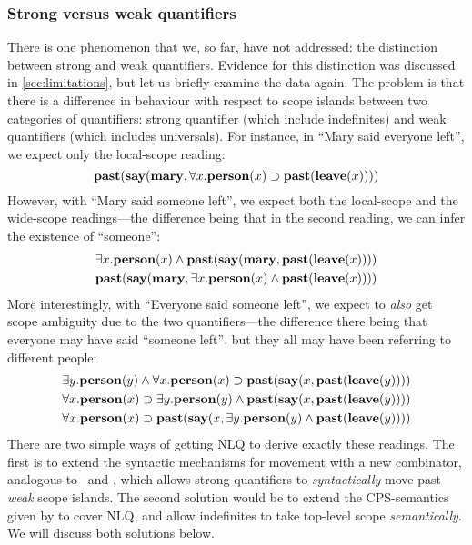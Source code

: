 \subsubsection{Strong versus weak quantifiers}
There is one phenomenon that we, so far, have not addressed: the
distinction between strong and weak quantifiers. Evidence for this
distinction was discussed in \autoref{sec:limitations}, but let us
briefly examine the data again. The problem is that there is a
difference in behaviour with respect to scope islands between two
categories of quantifiers: strong quantifier (which include
indefinites) and weak quantifiers (which includes universals). For
instance, in ``Mary said everyone left'', we expect only the
local-scope reading:
\[
  \mathbf{past}(\mathbf{say}(\mathbf{mary},\forall{x}.\mathbf{person}(x)\supset\mathbf{past}(\mathbf{leave}(x))))
\]
However, with ``Mary said someone left'', we expect both the
local-scope and the wide-scope readings---the difference being that in
the second reading, we can infer the existence of ``someone'':
\begin{gather*}
  \exists{x}.\mathbf{person}(x)\wedge\mathbf{past}(\mathbf{say}(\mathbf{mary},\mathbf{past}(\mathbf{leave}(x))))\\
  \mathbf{past}(\mathbf{say}(\mathbf{mary},\exists{x}.\mathbf{person}(x)\wedge\mathbf{past}(\mathbf{leave}(x))))
\end{gather*}
More interestingly, with ``Everyone said someone left'', we expect to
\emph{also} get scope ambiguity due to the two quantifiers---the
difference there being that everyone may have said ``someone left'',
but they all may have been referring to different people:
\begin{gather*}
  \exists{y}.\mathbf{person}(y)\wedge\forall{x}.\mathbf{person}(x)\supset\mathbf{past}(\mathbf{say}(x,\mathbf{past}(\mathbf{leave}(y))))\\
  \forall{x}.\mathbf{person}(x)\supset\exists{y}.\mathbf{person}(y)\wedge\mathbf{past}(\mathbf{say}(x,\mathbf{past}(\mathbf{leave}(y))))\\
  \forall{x}.\mathbf{person}(x)\supset\mathbf{past}(\mathbf{say}(x,\exists{y}.\mathbf{person}(y)\wedge\mathbf{past}(\mathbf{leave}(y))))
\end{gather*}
There are two simple ways of getting NLQ to derive exactly these
readings. The first is to extend the syntactic mechanisms for movement
with a new combinator, analogous to \B\ and \C, which allows strong
quantifiers to \emph{syntactically} move past \emph{weak} scope
islands. The second solution would be to extend the CPS-semantics
given by \citet{moortgat2012} to cover NLQ, and allow indefinites to
take top-level scope \emph{semantically}. We will discuss both
solutions below.

